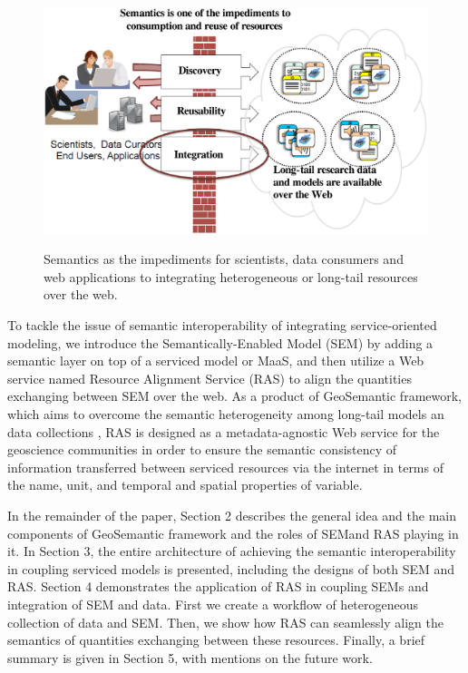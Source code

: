\documentclass[review]{elsarticle}
\begin{document}
\begin{figure}[!htbp]
\centering
\includegraphics[scale=0.5]{../figures/figure_1.eps}
\label{figure1}
\caption{Semantics as the impediments for scientists, data consumers and web applications to integrating heterogeneous or long-tail resources over the web.}
\end{figure}

To tackle the issue of semantic interoperability of integrating service-oriented modeling, we introduce the Semantically-Enabled Model (SEM) by adding a semantic layer on top of a serviced model or MaaS, and then utilize a Web service named Resource Alignment Service (RAS) to align the quantities exchanging between SEM over the web. As a product of GeoSemantic framework, which aims to overcome the semantic heterogeneity among long-tail models an data collections \citep{elag2015}, RAS is designed as a metadata-agnostic Web service for the geoscience communities in order to ensure the semantic consistency of information transferred between serviced resources via the internet in terms of the name, unit, and temporal and spatial properties of variable.

In the remainder of the paper, Section 2 describes the general idea and the main components of GeoSemantic framework and the roles of SEMand RAS playing in it. In Section 3, the entire architecture of achieving the semantic interoperability in coupling serviced models is presented, including the designs of both SEM and RAS. Section 4 demonstrates the application of RAS in coupling SEMs and integration of SEM and data. First we create a workflow of heterogeneous collection of data and SEM. Then, we show how RAS can seamlessly align the semantics of quantities exchanging between these resources. Finally, a brief summary is given in Section 5, with mentions on the future work. 
\end{document}
